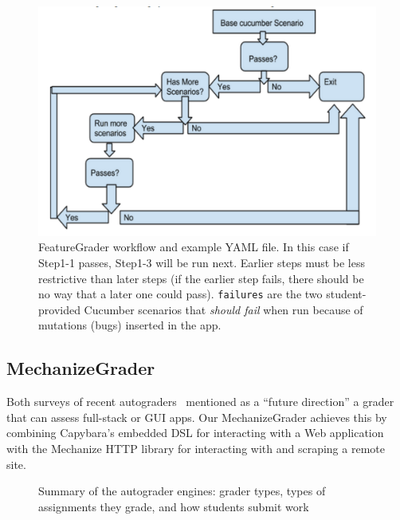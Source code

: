 \begin{figure}
  \begin{minipage}{0.45\textwidth}%
  \includegraphics[width=\textwidth]{figs/feature_grader.pdf}%
  \end{minipage}%
  \begin{minipage}{0.55\textwidth}%
  \end{minipage}
  \caption{\label{fig:featuregrader}%
FeatureGrader workflow and example YAML file.  In this case if Step1-1 passes,
Step1-3 will be run next.  Earlier steps must be less restrictive than
later steps (if the earlier step fails, there should be no way that a later one could pass).
\texttt{failures} are the two student-provided Cucumber scenarios that \emph{should fail} when
run because of mutations (bugs) inserted in the app.
}
\end{figure}

\subsection{MechanizeGrader}

Both surveys of recent
autograders~\cite{ihantola-2010-autograder-survey,douce-2005-autograder-survey} mentioned as
a ``future direction'' a grader that can assess full-stack or GUI apps.
Our MechanizeGrader achieves this by combining Capybara's embedded DSL
for interacting with a Web application with the Mechanize HTTP library
for interacting with and scraping a remote site.




\begin{figure}
  \caption{\label{fig:grader_summary} Summary of the autograder
    engines: grader types, types of assignments they grade, and
    how students submit work}
\end{figure}


